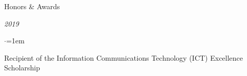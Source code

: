 \documentclass{resume} %
\begin{document}
\begin{rSection}{Honors \& Awards}
    \vspace{1em}

    \item \textit{2019}
    \begin{list}{$\cdot$}{\leftmargin=1em}
        \item Recipient of the Information Communications Technology (ICT) Excellence Scholarship
    \end{list}

\end{rSection}
\end{document}
